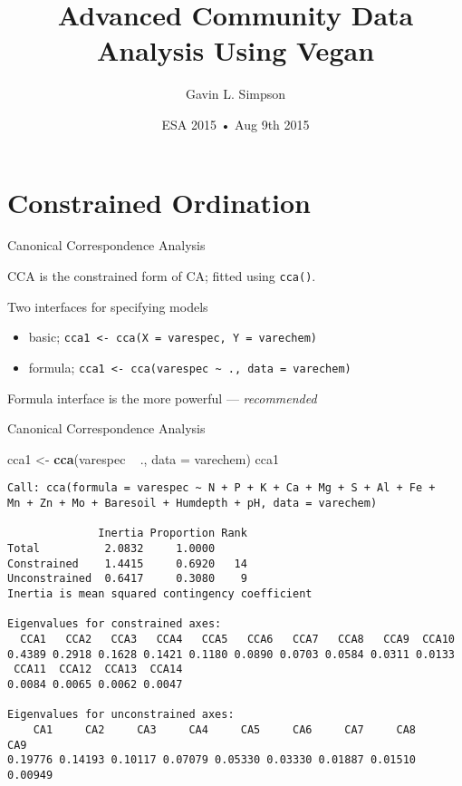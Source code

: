 \documentclass[10pt,ignorenonframetext,compress, aspectratio=169]{beamer}
\title{Advanced Community Data Analysis Using Vegan}
\author{Gavin L. Simpson}
\date{ESA 2015 • Aug 9th 2015}
\newenvironment{Shaded}{\begin{snugshade}}{\end{snugshade}}
\newcommand{\KeywordTok}[1]{\textcolor[rgb]{0.13,0.29,0.53}{\textbf{{#1}}}}
\newcommand{\DataTypeTok}[1]{\textcolor[rgb]{0.13,0.29,0.53}{{#1}}}
\newcommand{\StringTok}[1]{\textcolor[rgb]{0.31,0.60,0.02}{{#1}}}
\newcommand{\NormalTok}[1]{{#1}}
\begin{document}
\frame{\titlepage}

\section{Constrained Ordination}\label{constrained-ordination}

\begin{frame}{Canonical Correspondence Analysis}

CCA is the constrained form of CA; fitted using \texttt{cca()}.

Two interfaces for specifying models

\begin{itemize}
\itemsep1pt\parskip0pt
\item
  basic;
  \texttt{cca1\ \textless{}-\ cca(X\ =\ varespec,\ Y\ =\ varechem)}
\item
  formula;
  \texttt{cca1\ \textless{}-\ cca(varespec\ \textasciitilde{}\ .,\ data\ =\ varechem)}
\end{itemize}

Formula interface is the more powerful --- \emph{recommended}

\end{frame}

\begin{frame}[fragile]{Canonical Correspondence Analysis}

\tiny

\begin{Shaded}
\begin{Highlighting}[]
\NormalTok{cca1 <-}\StringTok{ }\KeywordTok{cca}\NormalTok{(varespec ~}\StringTok{ }\NormalTok{., }\DataTypeTok{data =} \NormalTok{varechem)}
\NormalTok{cca1}
\end{Highlighting}
\end{Shaded}

\begin{verbatim}
Call: cca(formula = varespec ~ N + P + K + Ca + Mg + S + Al + Fe +
Mn + Zn + Mo + Baresoil + Humdepth + pH, data = varechem)

              Inertia Proportion Rank
Total          2.0832     1.0000     
Constrained    1.4415     0.6920   14
Unconstrained  0.6417     0.3080    9
Inertia is mean squared contingency coefficient 

Eigenvalues for constrained axes:
  CCA1   CCA2   CCA3   CCA4   CCA5   CCA6   CCA7   CCA8   CCA9  CCA10 
0.4389 0.2918 0.1628 0.1421 0.1180 0.0890 0.0703 0.0584 0.0311 0.0133 
 CCA11  CCA12  CCA13  CCA14 
0.0084 0.0065 0.0062 0.0047 

Eigenvalues for unconstrained axes:
    CA1     CA2     CA3     CA4     CA5     CA6     CA7     CA8     CA9 
0.19776 0.14193 0.10117 0.07079 0.05330 0.03330 0.01887 0.01510 0.00949 
\end{verbatim}

\normalsize

\end{frame}
\end{document}
